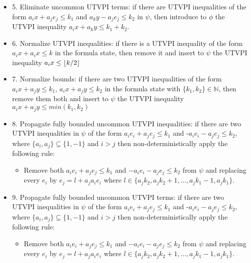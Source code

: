 \begin{itemize}
  \item[] 5. Eliminate uncommon UTVPI terms: 
    if there are UTVPI inequalities of the form $a_i x + a_j e_j \leq k_1$
    and $a_k y - a_j e_j \leq k_2$ in $\psi$, then introduce to $\phi$ the 
    UTVPI inequality $a_i x + a_k y \leq k_1 + k_2$.

  \item[] 6. Normalize UTVPI inequalities:
    if there is a UTVPI inequality of the form $a_i x + a_i x \leq k$ in 
    the formula state, then remove it and insert to $\psi$ the UTVPI
    inequality $a_i x \leq \lfloor k/2 \rfloor$

  \item[] 7.  Normalize bounds:
    if there are two UTVPI inequalities of the form $a_i x + a_j y \leq k_1$,
    $a_i x + a_j y \leq k_2$ in 
    the formula state with $\{k_1, k_2\} \in \mathbb{N}$, 
    then remove them both and insert to $\psi$ the UTVPI
    inequality $a_i x + a_j y \leq min(k_1, k_2)$

  \item[] 8.  Propagate fully bounded uncommon UTVPI inequalities: 
    if there are two UTVPI inequalities 
    in $\psi$ of the form $a_i e_i + a_j e_j \leq k_1$ and -$a_i e_i - a_j e_j \leq k_2$, 
    where $\{a_i, a_j\} \subseteq \{1, -1\}$ and $i > j$ 
    then  non-deterministically apply the following rule:
    \begin{itemize}
      \item Remove both $a_i e_i + a_j e_j \leq k_1$ and $-a_i e_i - a_j e_j \leq k_2$
        from $\psi$ and replacing every $e_i$ by $e_j = l + a_j a_i e_i$ where $
        l \in \{a_j k_2, a_j k_2 + 1, \dots, a_j k_1 - 1, a_j k_1\}$.
    \end{itemize}

  \item[] 9. Propagate fully bounded uncommon UTVPI terms: 
    if there are two UTVPI inequalities 
    in $\psi$ of the form $a_i e_i + a_j e_j \leq k_1$ and 
    -$a_i e_i - a_j e_j \leq k_2$, 
    where $\{a_i, a_j\} \subseteq \{1, -1\}$ and $i > j$ 
    then  non-deterministically apply the following rule:
    \begin{itemize}
      \item Remove both $a_i e_i + a_j e_j \leq k_1$ and $-a_i e_i - a_j e_j \leq k_2$
        from $\psi$ and replacing every $e_i$ by $e_j = l + a_j a_i e_i$ where $
        l \in \{a_j k_2, a_j k_2 + 1, \dots, a_j k_1 - 1, a_j k_1\}$.
    \end{itemize}
\end{itemize} 


